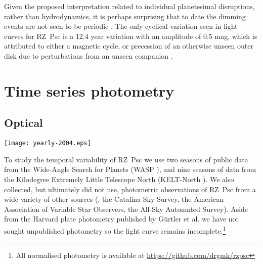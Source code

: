 \documentclass[]{rsos}
\begin{document}
Given the proposed interpretation related to individual planetesimal disruptions, rather
than hydrodynamics, it is perhaps surprising that to date the dimming events are not seen
to be periodic \cite{1999AstL...25..243R,2013A&A...553L...1D}. The only cyclical
variation seen in light curves for RZ~Psc is a 12.4 year variation with an amplitude of
0.5 mag, which is attributed to either a magnetic cycle, or precession of an otherwise
unseen outer disk due to perturbations from an unseen companion
\cite{2013A&A...553L...1D}.

\section{Time series photometry}\label{s:data}

\subsection{Optical}\label{ss:opt}

\begin{figure*}
  \begin{center}
    \hspace{-0.5cm} \texttt{[image: yearly-2004.eps]}
    \caption{WASP and KELT-North data. Photometry is shown in dimensionless form,
      relative to a quiescent level of 1, and was converted from observed magnitudes as
      described in the text.}\label{fig:waspkelt}
  \end{center}
\end{figure*}

To study the temporal variability of RZ~Psc we use two seasons of public data from the
Wide-Angle Search for Planets (WASP \cite{2006PASP..118.1407P,2010A&A...520L..10B}), and
nine seasons of data from the Kilodegree Extremely Little Telescope North (KELT-North
\cite{2007PASP..119..923P}). We also collected, but ultimately did not use, photometric
observations of RZ~Psc from a wide variety of other sources
(\cite{1994AJ....108.1906H,1973IBVS..783....1K,1980PZ.....21..310K,1985PZ.....22..181Z,1991Afz....34..333K,1997AcA....47..467P,2014Ap.....57..491P},
the Catalina Sky Survey, the American Association of Variable Star Observers, the All-Sky
Automated Survey). Aside from the Harvard plate photometry published by G\"urtler et
al. \cite{1999A&AS..140..293G} we have not sought unpublished photometry so the light
curve remains incomplete.\footnote{All normalised photometry is available at
  \href{https://github.com/drgmk/rzpsc}{https://github.com/drgmk/rzpsc}}
\end{document}
